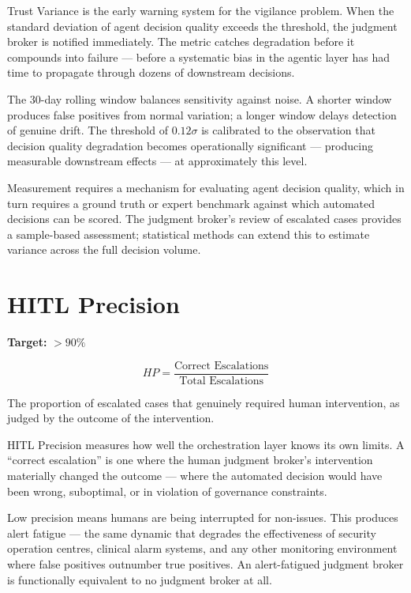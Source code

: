 Trust Variance is the early warning system for the vigilance problem. When the standard deviation of agent decision quality exceeds the threshold, the judgment broker is notified immediately. The metric catches degradation before it compounds into failure --- before a systematic bias in the agentic layer has had time to propagate through dozens of downstream decisions.

The 30-day rolling window balances sensitivity against noise. A shorter window produces false positives from normal variation; a longer window delays detection of genuine drift. The threshold of $0.12\sigma$ is calibrated to the observation that decision quality degradation becomes operationally significant --- producing measurable downstream effects --- at approximately this level.

Measurement requires a mechanism for evaluating agent decision quality, which in turn requires a ground truth or expert benchmark against which automated decisions can be scored. The judgment broker's review of escalated cases provides a sample-based assessment; statistical methods can extend this to estimate variance across the full decision volume.

\section{HITL Precision}

\begin{definitionbox}[title={Human-in-the-Loop Precision (HP)}]
\textbf{Target:} $> 90\%$

\[
HP = \frac{\text{Correct Escalations}}{\text{Total Escalations}}
\]

The proportion of escalated cases that genuinely required human intervention, as judged by the outcome of the intervention.
\end{definitionbox}

HITL Precision measures how well the orchestration layer knows its own limits. A ``correct escalation'' is one where the human judgment broker's intervention materially changed the outcome --- where the automated decision would have been wrong, suboptimal, or in violation of governance constraints.

Low precision means humans are being interrupted for non-issues. This produces alert fatigue --- the same dynamic that degrades the effectiveness of security operation centres, clinical alarm systems, and any other monitoring environment where false positives outnumber true positives. An alert-fatigued judgment broker is functionally equivalent to no judgment broker at all.

